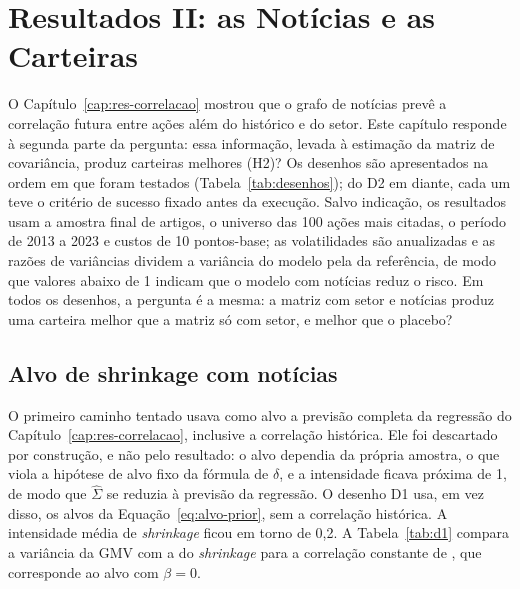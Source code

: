 \chapter{Resultados II: as Notícias e as Carteiras}
\label{cap:res-carteiras}

O Capítulo~\ref{cap:res-correlacao} mostrou que o grafo de notícias prevê a correlação futura entre ações
além do histórico e do setor. Este capítulo responde à segunda parte da pergunta: essa informação, levada à
estimação da matriz de covariância, produz carteiras melhores (H2)? Os desenhos são apresentados na ordem
em que foram testados (Tabela~\ref{tab:desenhos}); do D2 em diante, cada um teve o critério de sucesso
fixado antes da execução. Salvo indicação, os resultados usam a amostra final de artigos, o universo das
100 ações mais citadas, o período de 2013 a 2023 e custos de 10 pontos-base; as volatilidades são
anualizadas e as razões de variâncias dividem a variância do modelo pela da referência, de modo que valores
abaixo de 1 indicam que o modelo com notícias reduz o risco. Em todos os desenhos, a pergunta é a mesma:
a matriz com setor e notícias produz uma carteira melhor que a matriz só com setor, e melhor que o
placebo?

\section{Alvo de shrinkage com notícias}
\label{sec:d1}

O primeiro caminho tentado usava como alvo a previsão completa da regressão do Capítulo~\ref{cap:res-correlacao},
inclusive a correlação histórica. Ele foi descartado por construção, e não pelo resultado: o alvo dependia
da própria amostra, o que viola a hipótese de alvo fixo da fórmula de $\delta$, e a intensidade ficava
próxima de 1, de modo que $\hat\Sigma$ se reduzia à previsão da regressão. O desenho D1 usa, em vez disso,
os alvos da Equação~\eqref{eq:alvo-prior}, sem a correlação histórica. A intensidade média de
\emph{shrinkage} ficou em torno de 0,2. A Tabela~\ref{tab:d1} compara a variância da GMV com a do
\emph{shrinkage} para a correlação constante de \citet{ledoit2004honey}, que corresponde ao alvo com $\beta=0$.


